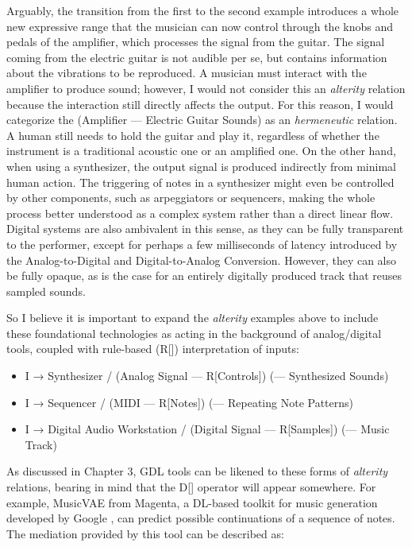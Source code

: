 Arguably, the transition from the first to the second example introduces a whole new expressive range that the musician can now control through the knobs and pedals of the amplifier, which processes the signal from the guitar. The signal coming from the electric guitar is not audible per se, but contains information about the vibrations to be reproduced. A musician must interact with the amplifier to produce sound; however, I would not consider this an \emph{alterity} relation because the interaction still directly affects the output. For this reason, I would categorize the (Amplifier --- Electric Guitar Sounds) as an \emph{hermeneutic} relation. A human still needs to hold the guitar and play it, regardless of whether the instrument is a traditional acoustic one or an amplified one. On the other hand, when using a synthesizer, the output signal is produced indirectly from minimal human action. The triggering of notes in a synthesizer might even be controlled by other components, such as arpeggiators or sequencers, making the whole process better understood as a complex system rather than a direct linear flow. Digital systems are also ambivalent in this sense, as they can be fully transparent to the performer, except for perhaps a few milliseconds of latency introduced by the Analog-to-Digital and Digital-to-Analog Conversion. However, they can also be fully opaque, as is the case for an entirely digitally produced track that reuses sampled sounds.

So I believe it is important to expand the \emph{alterity} examples above to include these foundational technologies as acting in the background of analog/digital tools, coupled with  rule-based (R[]) interpretation of inputs:

\begin{itemize}
	\singlespacing
	\item I → Synthesizer / (Analog Signal --- R[Controls]) (--- Synthesized Sounds)
	\item I → Sequencer / (MIDI --- R[Notes]) (--- Repeating Note Patterns)
	\item I → Digital Audio Workstation / (Digital Signal --- R[Samples]) (--- Music Track)
\end{itemize}

As discussed in Chapter 3, GDL tools can be likened to these forms of \emph{alterity} relations, bearing in mind that the D[] operator will appear somewhere. For example, MusicVAE from Magenta, a DL-based toolkit for music generation developed by Google \citep{Roberts2018}, can predict possible continuations of a sequence of notes. The mediation provided by this tool can be described as:

